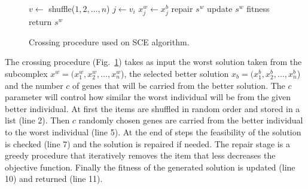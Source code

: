 \begin{figure}
\begin{algorithmic}[1]
    \State $v \leftarrow $ shuffle($1, 2, \ldots, n$)
	  \State $j \leftarrow v_i$
	  \State $x^w_j \leftarrow x^b_j$ 
	\EndFor
	  \State repair $s^w$
	\EndIf
	\State update $s^w$ fitness
  \State return $s^w$
  \EndProcedure
\end{algorithmic}
\caption{Crossing procedure used on SCE algorithm.}
\label{alg:cross}
\end{figure}

\newpage
The crossing procedure (Fig.~\ref{alg:cross}) takes as input the worst
solution taken from the subcomplex $x^w = (x^w_1, x^w_2, \ldots, x^w_n$),
the selected better solution $x_b = (x^b_1, x^b_2, \ldots, x^b_n$)
and the number $c$ of genes that will be carried from the better solution.
The $c$ parameter will control how similar the worst individual will be from the
given better individual.
At first the items are shuffled in random order and stored in a list (line 2).
Then $c$ randomly chosen genes are carried from the better individual to the worst
individual (line 5).
At the end of steps the feasibility of the solution is checked (line 7) and
the solution is repaired if needed.
The repair stage is a greedy procedure that iteratively removes the item that less
decreases the objective function.
Finally the fitness of the generated solution is updated (line 10) and
returned (line 11).


